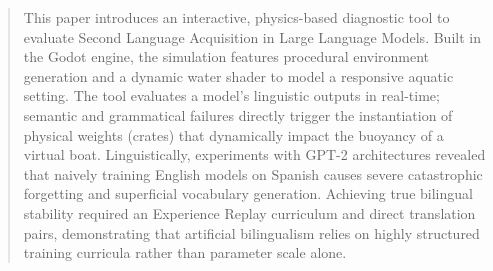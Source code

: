 \begin{abstract}
\label{abstract}    
This paper introduces an interactive, physics-based diagnostic tool to evaluate Second Language Acquisition in Large Language Models. Built in the Godot engine, the simulation features procedural environment generation and a dynamic water shader to model a responsive aquatic setting. The tool evaluates a model's linguistic outputs in real-time; semantic and grammatical failures directly trigger the instantiation of physical weights (crates) that dynamically impact the buoyancy of a virtual boat. Linguistically, experiments with GPT-2 architectures revealed that naively training English models on Spanish causes severe catastrophic forgetting and superficial vocabulary generation. Achieving true bilingual stability required an Experience Replay curriculum and direct translation pairs, demonstrating that artificial bilingualism relies on highly structured training curricula rather than parameter scale alone.
\end{abstract}